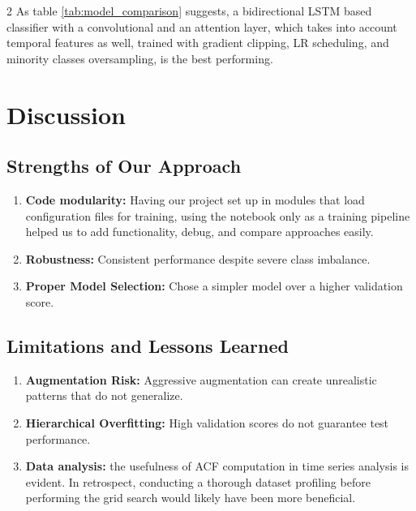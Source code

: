 \documentclass[11pt]{article}
\begin{document}
\begin{multicols}{2}
        As table \ref{tab:model_comparison} suggests, a bidirectional LSTM based classifier with a convolutional and an attention layer, which takes into account temporal features as well, trained with gradient clipping, LR scheduling, and minority classes oversampling, is the best performing.
        
        

        \section{Discussion}

        \subsection{Strengths of Our Approach}
        \begin{enumerate}[noitemsep,topsep=0pt]
            \setlength{\itemsep}{1pt}
            \setlength{\parskip}{0pt}
            \setlength{\parsep}{0pt}
            \item \textbf{Code modularity: } Having our project set up in modules that load configuration files for training, using the notebook only as a training pipeline helped us to add functionality, debug, and compare approaches easily. 
        \item \textbf{Robustness:} Consistent performance despite severe class imbalance.
            \item \textbf{Proper Model Selection:} Chose a simpler model over a higher validation score.
        \end{enumerate}
        \subsection{Limitations and Lessons Learned}
        \begin{enumerate}[noitemsep,topsep=0pt]
            \setlength{\itemsep}{1pt}
            \setlength{\parskip}{0pt}
            \setlength{\parsep}{0pt}
            \item \textbf{Augmentation Risk:} Aggressive augmentation can create unrealistic patterns that do not generalize.
            \item \textbf{Hierarchical Overfitting:} High validation scores do not guarantee test performance.
            \item \textbf{Data analysis:} the usefulness of ACF computation in time series analysis is evident. In retrospect, conducting a thorough dataset profiling before performing the grid search would likely have been more beneficial.
        \end{enumerate}

\end{multicols}
\end{document}

